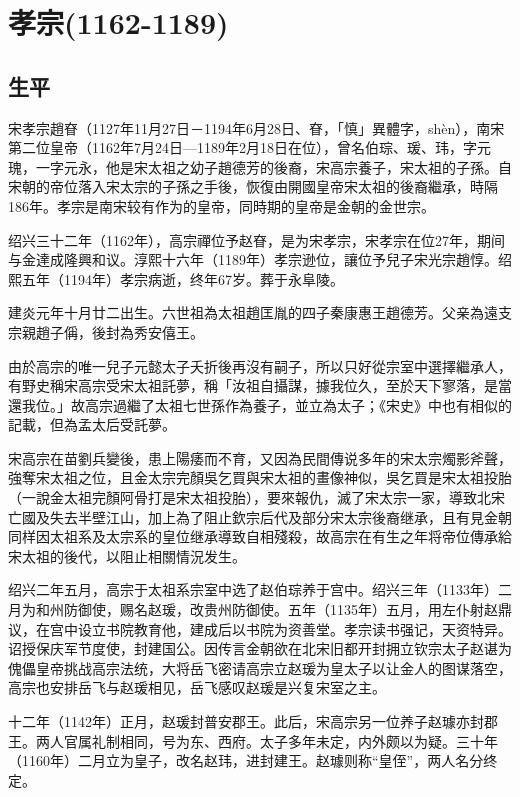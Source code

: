 
\section{孝宗\tiny(1162-1189)}

\subsection{生平}

宋孝宗趙眘（1127年11月27日－1194年6月28日、眘，「慎」異體字，shèn），南宋第二位皇帝（1162年7月24日—1189年2月18日在位），曾名伯琮、瑗、玮，字元瑰，一字元永，他是宋太祖之幼子趙德芳的後裔，宋高宗養子，宋太祖的子孫。自宋朝的帝位落入宋太宗的子孫之手後，恢復由開國皇帝宋太祖的後裔繼承，時隔186年。孝宗是南宋较有作为的皇帝，同時期的皇帝是金朝的金世宗。

绍兴三十二年（1162年），高宗禪位予赵眘，是为宋孝宗，宋孝宗在位27年，期间与金達成隆興和议。淳熙十六年（1189年）孝宗逊位，讓位予兒子宋光宗趙惇。绍熙五年（1194年）孝宗病逝，终年67岁。葬于永阜陵。

建炎元年十月廿二出生。六世祖為太祖趙匡胤的四子秦康惠王趙德芳。父亲為遠支宗親趙子偁，後封為秀安僖王。

由於高宗的唯一兒子元懿太子夭折後再沒有嗣子，所以只好從宗室中選擇繼承人，有野史稱宋高宗受宋太祖託夢，稱「汝祖自攝謀，據我位久，至於天下寥落，是當還我位。」故高宗過繼了太祖七世孫作為養子，並立為太子；《宋史》中也有相似的記載，但為孟太后受託夢。

宋高宗在苗劉兵變後，患上陽痿而不育，又因為民間傳说多年的宋太宗燭影斧聲，強奪宋太祖之位，且金太宗完顏吳乞買與宋太祖的畫像神似，吳乞買是宋太祖投胎（一說金太祖完顏阿骨打是宋太祖投胎），要來報仇，滅了宋太宗一家，導致北宋亡國及失去半壁江山，加上為了阻止欽宗后代及部分宋太宗後裔继承，且有見金朝同样因太祖系及太宗系的皇位继承導致自相殘殺，故高宗在有生之年将帝位傳承給宋太祖的後代，以阻止相關情況发生。

绍兴二年五月，高宗于太祖系宗室中选了赵伯琮养于宫中。绍兴三年（1133年）二月为和州防御使，赐名赵瑗，改贵州防御使。五年（1135年）五月，用左仆射赵鼎议，在宫中设立书院教育他，建成后以书院为资善堂。孝宗读书强记，天资特异。诏授保庆军节度使，封建国公。因传言金朝欲在北宋旧都开封拥立钦宗太子赵谌为傀儡皇帝挑战高宗法统，大将岳飞密请高宗立赵瑗为皇太子以让金人的图谋落空，高宗也安排岳飞与赵瑗相见，岳飞感叹赵瑗是兴复宋室之主。

十二年（1142年）正月，赵瑗封普安郡王。此后，宋高宗另一位养子赵璩亦封郡王。两人官属礼制相同，号为东、西府。太子多年未定，内外颇以为疑。三十年（1160年）二月立为皇子，改名赵玮，进封建王。赵璩则称“皇侄”，两人名分终定。

